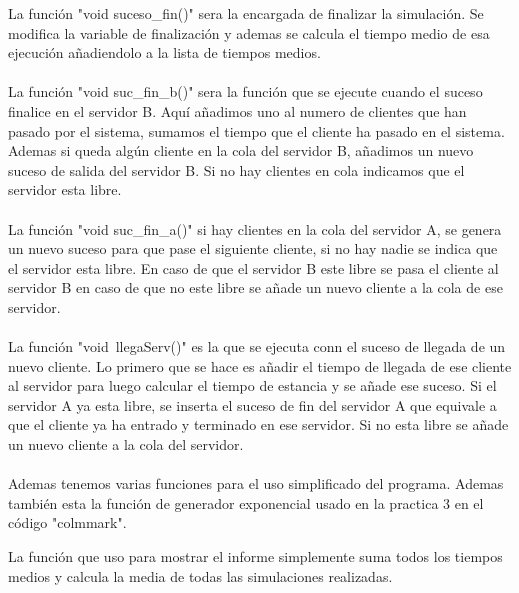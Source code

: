 \documentclass[12pt,a4paper]{article}
\begin{document}
La función "void suceso\_fin()" sera la encargada de finalizar la simulación. Se modifica la variable de finalización y ademas se calcula el tiempo medio de esa ejecución añadiendolo a la lista de tiempos medios.\\
\\
La función "void suc\_fin\_b()" sera la función que se ejecute cuando el suceso finalice en el servidor B. Aquí añadimos uno al numero de clientes que han pasado por el sistema, sumamos el  tiempo que el cliente ha pasado en el sistema. Ademas si queda algún cliente en la cola del servidor B, añadimos un nuevo suceso de salida del servidor B. Si no hay clientes en cola indicamos que el servidor esta libre.\\\\

La función "void suc\_fin\_a()" si hay clientes en la cola del servidor A, se genera un nuevo suceso para que pase el siguiente cliente, si no hay nadie se indica que el servidor esta libre. En caso de que el servidor B este libre se pasa el cliente al servidor B en caso de que no este libre se añade un nuevo cliente a la cola de ese servidor.\\\\

La función "void\ llegaServ()"  es la que se ejecuta conn el suceso de llegada de un nuevo cliente. Lo primero que se hace es añadir el tiempo de llegada de ese cliente al servidor para luego calcular el tiempo de estancia y se añade ese suceso. Si el servidor A ya esta libre, se inserta el suceso de fin del servidor A que equivale a que el cliente ya ha entrado y terminado en ese servidor. Si no esta libre se añade un nuevo cliente a la cola del servidor. \\\\
Ademas tenemos varias funciones para el uso simplificado del programa. Ademas también esta la función de generador exponencial usado en la practica 3 en el código "colmmark". 

La función que uso para mostrar el informe simplemente suma todos los tiempos medios  y calcula la media de todas las simulaciones realizadas. 
\end{document}
